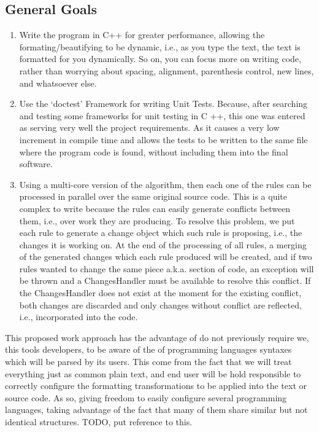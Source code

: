 \subsection{General Goals}

\begin{enumerate}[leftmargin=*]

    \item Write the program in C++ for greater performance, allowing the
    formating/beautifying to be dynamic, i.e.,
    as you type the text,
    the text is formatted for you dynamically.
    So on,
    you can focus more on writing code,
    rather than worrying about spacing,
    alignment, parenthesis control, new lines, and whatsoever else.

    \item Use the `doctest' Framework for writing Unit Tests. Because,
    after searching and testing some frameworks for unit testing in C ++,
    this one was entered as serving very well the project requirements.
    As it causes a very low increment in compile time and allows the tests to be written to the same file where the
    program code is found,
    without including them into the final software.

    \item Using a multi-core version of the algorithm,
    then each one of the rules can be processed in parallel over the same original source code.
    This is a quite complex to write because the rules can easily generate conflicts between them, i.e.,
    over work they are producing.
    To resolve this problem,
    we put each rule to generate a change object which such rule is proposing, i.e.,
    the changes it is working on.
    At the end of the processing of all rules,
    a merging of the generated changes which each rule produced will be created,
    and if two rules wanted to change the same piece a.k.a.
    section of code,
    an exception will be thrown and a Changes\q Handler must be available to resolve this conflict.
    If the Changes\q Handler does not exist at the moment for the existing conflict,
    both changes are discarded and only changes without conflict are reflected, i.e.,
    incorporated into the code.

\end{enumerate}

This proposed work approach has the advantage of do not previously require we, this tools developers,
to be aware of the of programming languages syntaxes which will be parsed by its users.
This come from the fact that we will treat everything just as common plain text,
and end user will be hold responsible to correctly configure the formatting transformations to be applied into the
text or source code.
As so,
giving freedom to easily configure several programming languages,
taking advantage of the fact that many of them share similar but not identical structures.
TODO,
put reference to this.

